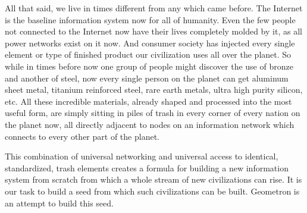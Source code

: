 All that said, we live in times different from any which came before.
The Internet is the baseline information system now for all of humanity.
Even the few people not connected to the Internet now have their lives
completely molded by it, as all power networks exist on it now. And
consumer society has injected every single element or type of finished
product our civilization uses all over the planet. So while in times
before now one group of people might discover the use of bronze and
another of steel, now every single person on the planet can get aluminum
sheet metal, titanium reinforced steel, rare earth metals, ultra high
purity silicon, etc. All these incredible materials, already shaped and
processed into the most useful form, are simply sitting in piles of
trash in every corner of every nation on the planet now, all directly
adjacent to nodes on an information network which connects to every
other part of the planet.

This combination of universal networking and universal access to
identical, standardized, trash elements creates a formula for building a
new information system from scratch from which a whole stream of new
civilizations can rise. It is our task to build a seed from which such
civilizations can be built. Geometron is an attempt to build this seed.
